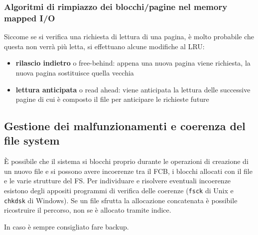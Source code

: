 \documentclass[a4paper]{article}
\begin{document}
\subsubsection*{Algoritmi di rimpiazzo dei blocchi/pagine nel memory mapped I/O}
Siccome se si verifica una richiesta di lettura di una pagina, è molto probabile che questa non verrà più letta, si effettuano
alcune modifiche al LRU: \begin{itemize}
	\item \textbf{rilascio indietro} o free-behind: appena una nuova pagina viene richiesta, la nuova pagina sostituisce quella
	vecchia
	\item \textbf{lettura anticipata} o read ahead: viene anticipata la lettura delle successive pagine di cui è composto il
	file per anticipare le richieste future
\end{itemize}


\subsection{Gestione dei malfunzionamenti e coerenza del file system}
È possibile che il sistema si blocchi proprio durante le operazioni di creazione di un nuovo file e si possono avere incoerenze
tra il FCB, i blocchi allocati con il file e le varie strutture del FS. Per individuare e risolvere eventuali incoerenze esistono
degli appositi programmi di verifica delle coerenze (\verb|fsck| di Unix e \verb|chkdsk| di Windows). Se un file sfrutta la
allocazione concatenata è possibile ricostruire il percorso, non se è allocato tramite indice.

In caso è sempre consigliato fare backup.

\newpage
\end{document}
